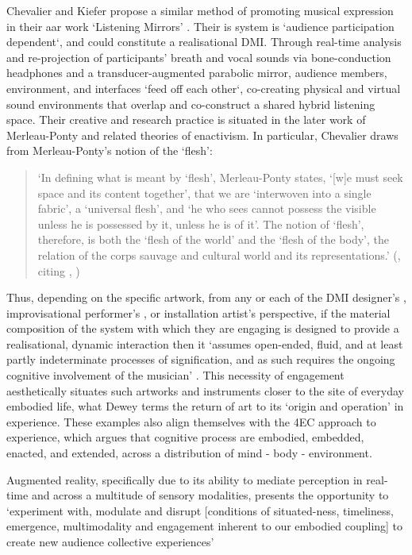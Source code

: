 Chevalier and Kiefer propose a similar method of promoting musical expression in their \gls{aar} work `Listening Mirrors' \citeyearpar[]{chevalier2018}. Their is system is `audience participation dependent`, and could constitute a realisational DMI. Through real-time analysis and re-projection of participants' breath and vocal sounds via bone-conduction headphones and a transducer-augmented parabolic mirror, audience members, environment, and interfaces `feed off each other`, co-creating physical and virtual sound environments that overlap and co-construct a shared hybrid listening space. Their creative and research practice is situated in the later work of Merleau-Ponty and related theories of enactivism. In particular, Chevalier draws from Merleau-Ponty's notion of the `flesh':
\begin{quote}
    `In defining what is meant by `flesh', Merleau-Ponty states, `[w]e must seek space and its content together', that we are `interwoven into a single fabric', a `universal flesh', and `he who sees cannot possess the visible unless he is possessed by it, unless he is of it'. The notion of `flesh', therefore, is both the `flesh of the world' and the `flesh of the body', the relation of the corps sauvage and cultural world and its representations.' (\citeauthor[p. 58]{chevalier2016}, \citeyearpar{chevalier2016}  citing \citeauthor{merleau-ponty1945}, \citeyearpar{merleau-ponty1945,merleau-ponty1968})
\end{quote}

Thus, depending on the specific artwork, from any or each of the DMI designer's \citep[]{essl2006,armstrong2006}, improvisational performer's \citep[]{hayes2019}, or installation artist's \citep[]{chevalier2018} perspective, if the material composition of the system with which they are engaging is designed to provide a realisational, dynamic interaction then it `assumes open-ended, fluid, and at least partly indeterminate processes of signification, and as such requires the ongoing cognitive involvement of the musician' \citep[p. 48]{armstrong2006}. This necessity of engagement aesthetically situates such artworks and instruments closer to the site of everyday embodied life, what Dewey terms the return of art to its `origin and operation' in experience. These examples also align themselves with the 4EC approach to experience, which argues that cognitive process are embodied, embedded, enacted, and extended, across a distribution of mind - body - environment. 

Augmented reality, specifically due to its ability to mediate perception in real-time and across a multitude of sensory modalities, presents the opportunity to `experiment with, modulate and disrupt [conditions of situated-ness, timeliness, emergence, multimodality and engagement inherent to our embodied coupling] to create new audience collective experiences' \citep[]{chevalier2018}



